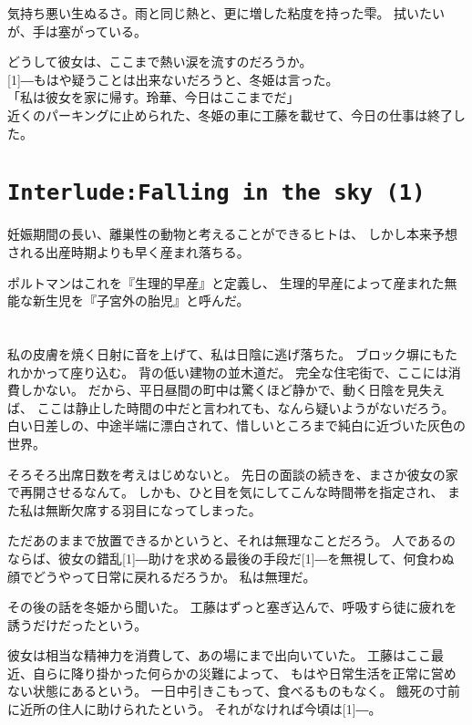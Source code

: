 \documentclass[../HiganMain]{subfiles}
\begin{document}
気持ち悪い生ぬるさ。雨と同じ熱と、更に増した粘度を持った雫。
拭いたいが、手は塞がっている。

どうして彼女は、ここまで熱い涙を流すのだろうか。\\

\scalebox{3}[1]{―}もはや疑うことは出来ないだろうと、冬姫は言った。\\
「私は彼女を家に帰す。玲華、今日はここまでだ」\\
近くのパーキングに止められた、冬姫の車に工藤を載せて、今日の仕事は終了した。

\section*{\tt Interlude:Falling in the sky (1)}
{\gt
妊娠期間の長い、離巣性の動物と考えることができるヒトは、
しかし本来予想される出産時期よりも早く産まれ落ちる。

ポルトマンはこれを『生理的早産』と定義し、
生理的早産によって産まれた無能な新生児を『子宮外の胎児』と呼んだ。
}

\section{}
私の皮膚を焼く日射に音を上げて、私は日陰に逃げ落ちた。
ブロック塀にもたれかかって座り込む。
背の低い建物の並木道だ。
完全な住宅街で、ここには消費しかない。
だから、平日昼間の町中は驚くほど静かで、動く日陰を見失えば、
ここは静止した時間の中だと言われても、なんら疑いようがないだろう。
白い日差しの、中途半端に漂白されて、惜しいところまで純白に近づいた灰色の世界。

そろそろ出席日数を考えはじめないと。
先日の面談の続きを、まさか彼女の家で再開させるなんて。
しかも、ひと目を気にしてこんな時間帯を指定され、
また私は無断欠席する羽目になってしまった。

ただあのままで放置できるかというと、それは無理なことだろう。
人であるのならば、彼女の錯乱\scalebox{3}[1]{―}助けを求める最後の手段だ\scalebox{3}[1]{―}を無視して、何食わぬ顔でどうやって日常に戻れるだろうか。
私は無理だ。

その後の話を冬姫から聞いた。
工藤はずっと塞ぎ込んで、呼吸すら徒に疲れを誘うだけだったという。

彼女は相当な精神力を消費して、あの場にまで出向いていた。
工藤はここ最近、自らに降り掛かった何らかの災難によって、
もはや日常生活を正常に営めない状態にあるという。
一日中引きこもって、食べるものもなく。
餓死の寸前に近所の住人に助けられたという。
それがなければ今頃は\scalebox{3}[1]{―}。
\end{document}
